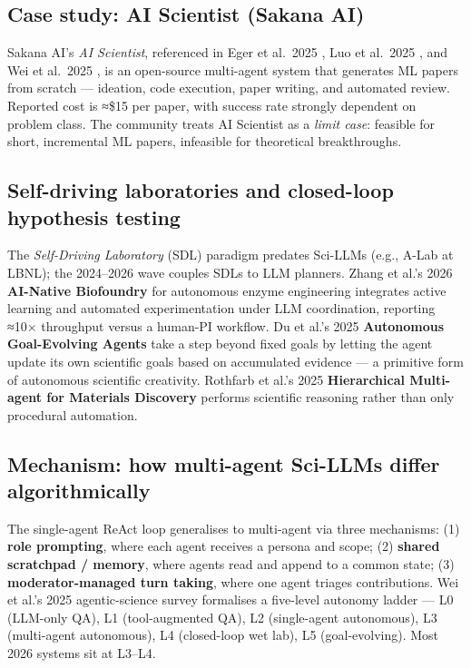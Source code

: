 \documentclass{article}
\begin{document}
\subsection{Case study: AI Scientist (Sakana AI)}\label{case-study-ai-scientist-sakana-ai}

Sakana AI's \emph{AI Scientist}, referenced in Eger et al.~2025 \cite{eger2025transformingscienc}, Luo et al.~2025 \cite{luo2025llm4srasurveyonlar}, and Wei et al.~2025 \cite{wei2025fromaiforscienceto}, is an open-source multi-agent system that generates ML papers from scratch --- ideation, code execution, paper writing, and automated review. Reported cost is ≈\$15 per paper, with success rate strongly dependent on problem class. The community treats AI Scientist as a \emph{limit case}: feasible for short, incremental ML papers, infeasible for theoretical breakthroughs.

\subsection{Self-driving laboratories and closed-loop hypothesis testing}\label{self-driving-laboratories-and-closed-loop-hypothesis-testing}

The \emph{Self-Driving Laboratory} (SDL) paradigm predates Sci-LLMs (e.g., A-Lab at LBNL); the 2024--2026 wave couples SDLs to LLM planners. Zhang et al.'s 2026 \textbf{AI-Native Biofoundry} for autonomous enzyme engineering \cite{zhang2026anainativebiofound} integrates active learning and automated experimentation under LLM coordination, reporting ≈10× throughput versus a human-PI workflow. Du et al.'s 2025 \textbf{Autonomous Goal-Evolving Agents} \cite{du2025acceleratingscient} take a step beyond fixed goals by letting the agent update its own scientific goals based on accumulated evidence --- a primitive form of autonomous scientific creativity. Rothfarb et al.'s 2025 \textbf{Hierarchical Multi-agent for Materials Discovery} \cite{rothfarb2025hierarchicalmultia} performs scientific reasoning rather than only procedural automation.

\subsection{Mechanism: how multi-agent Sci-LLMs differ algorithmically}\label{mechanism-how-multi-agent-sci-llms-differ-algorithmically}

The single-agent ReAct loop generalises to multi-agent via three mechanisms: (1) \textbf{role prompting}, where each agent receives a persona and scope; (2) \textbf{shared scratchpad / memory}, where agents read and append to a common state; (3) \textbf{moderator-managed turn taking}, where one agent triages contributions. Wei et al.'s 2025 agentic-science survey \cite{wei2025fromaiforscienceto} formalises a five-level autonomy ladder --- L0 (LLM-only QA), L1 (tool-augmented QA), L2 (single-agent autonomous), L3 (multi-agent autonomous), L4 (closed-loop wet lab), L5 (goal-evolving). Most 2026 systems sit at L3--L4.
\end{document}
